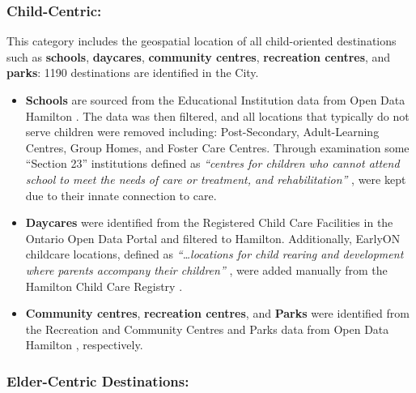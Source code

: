 \documentclass[
  super,
  preprint,
  3p]{elsarticle}
\providecommand{\tightlist}{%
  \setlength{\itemsep}{0pt}\setlength{\parskip}{0pt}}\usepackage{longtable,booktabs,array}
\begin{document}
\hypertarget{child-centric}{%
\subsubsection{Child-Centric:}\label{child-centric}}

This category includes the geospatial location of all child-oriented
destinations such as \textbf{schools}, \textbf{daycares},
\textbf{community centres}, \textbf{recreation centres}, and
\textbf{parks}: 1190 destinations are identified in the City.

\begin{itemize}
\tightlist
\item
  \textbf{Schools} are sourced from the Educational Institution data
  from Open Data Hamilton
  \citep{opendatahamiltonEducationalInstitutions2022}. The data was then
  filtered, and all locations that typically do not serve children were
  removed including: Post-Secondary, Adult-Learning Centres, Group
  Homes, and Foster Care Centres. Through examination some ``Section
  23'' institutions defined as \emph{``centres for children who cannot
  attend school to meet the needs of care or treatment, and
  rehabilitation''}
  \citep{governmentofontarioministryofeducationFundingEducationCommunity2023},
  were kept due to their innate connection to care.
\item
  \textbf{Daycares} were identified from the Registered Child Care
  Facilities in the Ontario Open Data Portal
  \citep{governmentofontarioOntarioDataCatalogue2023} and filtered to
  Hamilton. Additionally, EarlyON childcare locations, defined as
  \emph{``\ldots locations for child rearing and development where
  parents accompany their children''}
  \citep{cityofhamiltonChildCareRegistry2023}, were added manually from
  the Hamilton Child Care Registry
  \citep{cityofhamiltonChildCareRegistry2023}.
\item
  \textbf{Community centres}, \textbf{recreation centres}, and
  \textbf{Parks} were identified from the Recreation and Community
  Centres and Parks data from Open Data Hamilton
  \citep{opendatahamiltonParksDatabase2022, opendatahamiltonRecreationCommunityCentres2022},
  respectively.
\end{itemize}

\hypertarget{elder-centric-destinations}{%
\subsubsection{Elder-Centric
Destinations:}\label{elder-centric-destinations}}
\end{document}
